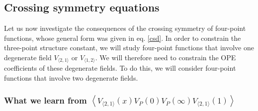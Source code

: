 \documentclass[12pt, a4paper, notitlepage, twoside]{report}
\numberwithin{equation}{section}
\theoremstyle{break}
\begin{document}
\subsection{Crossing symmetry equations \label{seccbe}}

Let us now investigate the consequences of the crossing symmetry of four-point functions, whose general form was given in eq. \eqref{csd}. In order to constrain the three-point structure constant, we will study four-point functions that involve one degenerate field $V_{\langle 2,1\rangle}$ or $V_{\langle 1, 2\rangle}$. We will therefore need to constrain the OPE coefficients of these degenerate fields. 
To do this, we will consider four-point functions that involve two degenerate fields. 


\subsubsection{What we learn from $
 \left\langle V_{\langle 2,1 \rangle}(x) V_P(0) V_{P}(\infty) V_{\langle 2,1 \rangle}(1) \right\rangle$}
 
\end{document}
